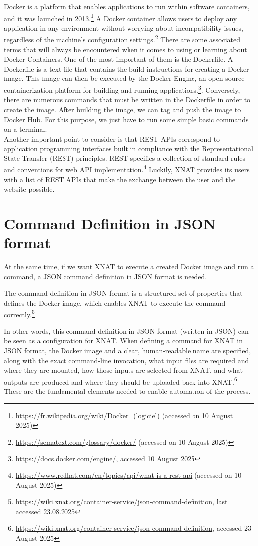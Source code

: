 Docker is a platform that enables applications to run within software containers, and it was launched in 2013.\footnote{\url{https://fr.wikipedia.org/wiki/Docker\_(logiciel)} (accessed on 10 August 2025)} A Docker container allows users to deploy any application in any environment without worrying about incompatibility issues, regardless of the machine’s configuration settings.\footnote{\url{https://sematext.com/glossary/docker/} (accessed on 10 August 2025)} There are some associated terms that will always be encountered when it comes to using or learning about Docker Containers.
One of the most important of them is the Dockerfile. A Dockerfile is a text file that contains the build instructions for creating a Docker image. This image can then be executed by the Docker Engine, an open-source containerization platform for building and running applications.\footnote{\url{https://docs.docker.com/engine/}, accessed 10 August 2025}. Conversely, there are numerous commands that must be written in the Dockerfile in order to create the image. After building the image, we can tag and push the image to Docker Hub. For this purpose, we just have to run some simple basic commands on a terminal.
\\
Another important point to consider is that REST APIs correspond to application programming interfaces built in compliance with the Representational State Transfer (REST) principles.
REST specifies a collection of standard rules and conventions for web API implementation.\footnote{\url{https://www.redhat.com/en/topics/api/what-is-a-rest-api} (accessed on 10 August 2025)} Luckily, XNAT provides its users with a list of REST APIs that make the exchange between the user and the website possible. 

\section{Command Definition in JSON format}
At the same time, if we want XNAT to execute a created Docker image and run a command, a \ac{JSON} command definition in JSON format is needed. 

The command definition in JSON format is a structured set of properties that defines the Docker image, which enables XNAT to execute the command correctly.\footnote{\url{https://wiki.xnat.org/container-service/json-command-definition}, last accessed 23.08.2025}

In other words, this command definition in JSON format (written in JSON) can be seen as a configuration for XNAT. When defining a command for XNAT in JSON format, the Docker image and a clear, human-readable name are specified, along with the exact command-line invocation, what input files are required and where they are mounted, how those inputs are selected from XNAT, and what outputs are produced and where they should be uploaded back into XNAT.\footnote{\url{https://wiki.xnat.org/container-service/json-command-definition}, accessed 23 August 2025}
These are the fundamental elements needed to enable automation of the process.



